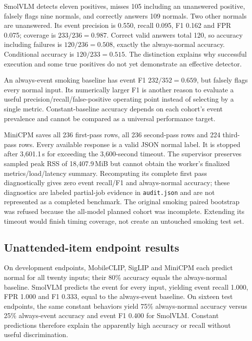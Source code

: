\documentclass[11pt,a4paper]{article}
\newcommand{\code}[1]{\nolinkurl{#1}}
\begin{document}
SmolVLM detects eleven positives, misses 105 including an unanswered positive, falsely flags nine normals, and correctly answers 109 normals. Two other normals are unanswered. Its event precision is 0.550, recall 0.095, F1 0.162 and FPR 0.075; coverage is $233/236=0.987$. Correct valid answers total 120, so accuracy including failures is $120/236=0.508$, exactly the always-normal accuracy. Conditional accuracy is $120/233=0.515$. The distinction explains why successful execution and some true positives do not yet demonstrate an effective detector.

An always-event smoking baseline has event F1 $232/352=0.659$, but falsely flags every normal input. Its numerically larger F1 is another reason to evaluate a useful precision/recall/false-positive operating point instead of selecting by a single metric. Constant-baseline accuracy depends on each cohort's event prevalence and cannot be compared as a universal performance target.

MiniCPM saves all 236 first-pass rows, all 236 second-pass rows and 224 third-pass rows. Every available response is a valid JSON normal label. It is stopped after 3,601.1\,s for exceeding the 3,600-second timeout. The supervisor preserves sampled peak RSS of 18,407.9\,MiB but cannot obtain the worker's finalized metrics/load/latency summary. Recomputing its complete first pass diagnostically gives zero event recall/F1 and always-normal accuracy; these diagnostics are labeled partial-job evidence in \code{audit.json} and are not represented as a completed benchmark. The original smoking paired bootstrap was refused because the all-model planned cohort was incomplete. Extending its timeout would finish timing coverage, not create an untouched smoking test set.

\subsection{Unattended-item endpoint results}
On development endpoints, MobileCLIP, SigLIP and MiniCPM each predict normal for all twenty inputs; their 80\% accuracy equals the always-normal baseline. SmolVLM predicts the event for every input, yielding event recall 1.000, FPR 1.000 and F1 0.333, equal to the always-event baseline. On sixteen test endpoints, the same constant behaviors yield 75\% always-normal accuracy versus 25\% always-event accuracy and event F1 0.400 for SmolVLM. Constant predictions therefore explain the apparently high accuracy or recall without useful discrimination.
\end{document}
